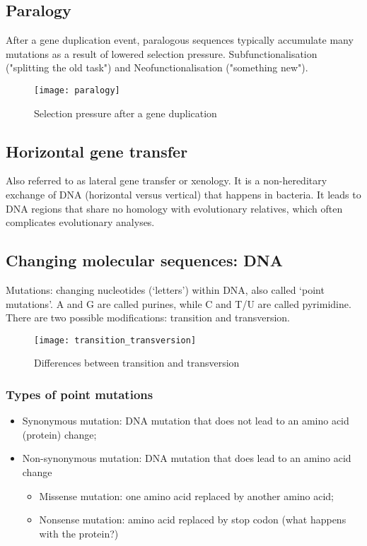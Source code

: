 \subsection{Paralogy}

After a gene duplication event, paralogous sequences typically accumulate many
mutations as a result of lowered selection pressure. Subfunctionalisation
("splitting the old task") and Neofunctionalisation ("something new").

\begin{figure}[!htpb]
\centering
\texttt{[image: paralogy]}
\caption{Selection pressure after a gene duplication}
\label{Paralogy}
\end{figure}

\subsection{Horizontal gene transfer}

Also referred to as lateral gene transfer or xenology. It is a non-hereditary
exchange of DNA (horizontal versus vertical) that happens in bacteria.
It leads to DNA regions that share no homology with evolutionary relatives, which
often complicates evolutionary analyses.

\subsection{Changing molecular sequences: DNA}

Mutations: changing nucleotides (`letters') within DNA, also called `point
mutations'. A and G are called purines, while C and T/U are called pyrimidine.
There are two possible modifications: transition and transversion.

\begin{figure}[!htpb]
\centering
\texttt{[image: transition\_transversion]}
\caption{Differences between transition and transversion}
\label{Transition and Transversion}
\end{figure}

\subsubsection{Types of point mutations}

\begin{itemize}
\item Synonymous mutation: DNA mutation that does not lead to an amino acid
(protein) change;
\item Non-synonymous mutation: DNA mutation that does lead to an amino acid
change
\begin{itemize}
\item Missense mutation: one amino acid replaced by another amino acid;
\item Nonsense mutation: amino acid replaced by stop codon (what happens with
the protein?)
\end{itemize}
\end{itemize}

